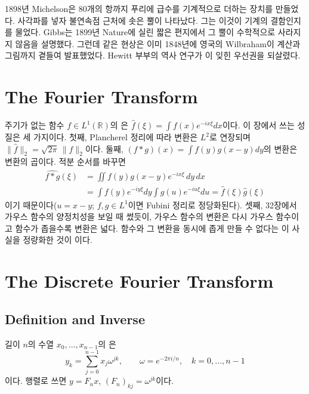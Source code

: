 \begin{aside}[Gibbs보다 50년 먼저]
1898년 Michelson은 80개의 항까지 푸리에 급수를 기계적으로 더하는 장치를 만들었다. 사각파를 넣자 불연속점 근처에 솟은 뿔이 나타났다. 그는 이것이 기계의 결함인지를 물었다. Gibbs는 1899년 Nature에 실린 짧은 편지에서 그 뿔이 수학적으로 사라지지 않음을 설명했다\cite{gibbs1899}. 그런데 같은 현상은 이미 1848년에 영국의 Wilbraham이 계산과 그림까지 곁들여 발표했었다\cite{wilbraham1848}. Hewitt 부부의 역사 연구가 이 잊힌 우선권을 되살렸다\cite{hewitt1979}.
\end{aside}

\section{The Fourier Transform}
\label{sec:fourier-transform}

주기가 없는 함수 $f\in L^1(\mathbb R)$의 은 $\hat f(\xi)=\int f(x)e^{-ix\xi}dx$이다. 이 장에서 쓰는 성질은 세 가지이다. 첫째, Plancherel 정리에 따라 변환은 $L^2$로 연장되며 $\|\hat f\|_2=\sqrt{2\pi}\,\|f\|_2$이다. 둘째,  $(f*g)(x)=\int f(y)g(x-y)dy$의 변환은 변환의 곱이다. 적분 순서를 바꾸면
\begin{align*}
\widehat{f*g}(\xi)&=\iint f(y)g(x-y)e^{-ix\xi}\,dy\,dx\\
&=\int f(y)e^{-iy\xi}dy\int g(u)e^{-iu\xi}du=\hat f(\xi)\hat g(\xi)
\end{align*}
이기 때문이다($u=x-y$; $f,g\in L^1$이면 Fubini 정리로 정당화된다). 셋째, 32장에서 가우스 함수의 양정치성을 보일 때 썼듯이, 가우스 함수의 변환은 다시 가우스 함수이고 함수가 좁을수록 변환은 넓다. 함수와 그 변환을 동시에 좁게 만들 수 없다는 이 사실을 정량화한 것이 이다\cite{stein2003fourier}.

\section{The Discrete Fourier Transform}
\label{sec:dft}

\subsection{Definition and Inverse}

길이 $n$의 수열 $x_0,\dots,x_{n-1}$의 은
\[
y_k=\sum_{j=0}^{n-1}x_j\omega^{jk},\qquad\omega=e^{-2\pi i/n},\quad k=0,\dots,n-1
\]
이다. 행렬로 쓰면 $y=F_nx$, $(F_n)_{kj}=\omega^{jk}$이다.

